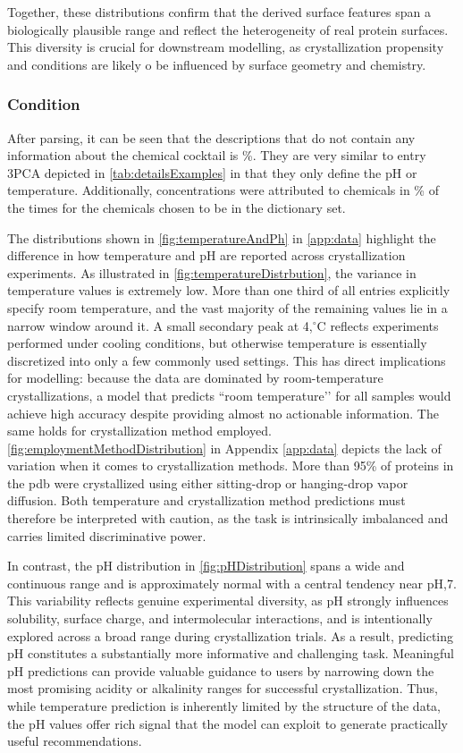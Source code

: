Together, these distributions confirm that the derived surface features span a biologically plausible range and reflect the heterogeneity of real protein surfaces. This diversity is crucial for downstream modelling, as crystallization propensity and conditions are likely o be influenced by surface geometry and chemistry. 

\subsubsection{Condition}\label{sec:data_analysis/univariate_analysis/condition}
After parsing, it can be seen that the descriptions that do not contain any information about the chemical cocktail is  \%. They are very similar to entry 3PCA depicted in \autoref{tab:detailsExamples} in that they only define the pH or temperature. Additionally, concentrations were attributed to chemicals in \% of the times for the chemicals chosen to be in the dictionary set. 

The distributions shown in \autoref{fig:temperatureAndPh}  in \ref{app:data} highlight the difference in how temperature and pH are reported across crystallization experiments. As illustrated in \autoref{fig:temperatureDistrbution}, the variance in temperature values is extremely low. More than one third of all entries explicitly specify room temperature, and the vast majority of the remaining values lie in a narrow window around it. A small secondary peak at 4,$^\circ$C reflects experiments performed under cooling conditions, but otherwise temperature is essentially discretized into only a few commonly used settings. This has direct implications for modelling: because the data are dominated by room-temperature crystallizations, a model that predicts “room temperature’’ for all samples would achieve high accuracy despite providing almost no actionable information. The same holds for crystallization method employed. \autoref{fig:employmentMethodDistribution} in Appendix \ref{app:data} depicts the lack of variation when it comes to crystallization methods. More than 95\% of proteins in the \gls{pdb} were crystallized using either sitting-drop or hanging-drop vapor diffusion. Both temperature and crystallization method predictions must therefore be interpreted with caution, as the task is intrinsically imbalanced and carries limited discriminative power.

In contrast, the pH distribution in \autoref{fig:pHDistribution} spans a wide and continuous range and is approximately normal with a central tendency near pH,7. This variability reflects genuine experimental diversity, as pH strongly influences solubility, surface charge, and intermolecular interactions, and is intentionally explored across a broad range during crystallization trials. As a result, predicting pH constitutes a substantially more informative and challenging task. Meaningful pH predictions can provide valuable guidance to users by narrowing down the most promising acidity or alkalinity ranges for successful crystallization. Thus, while temperature prediction is inherently limited by the structure of the data, the pH values offer rich signal that the model can exploit to generate practically useful recommendations.

